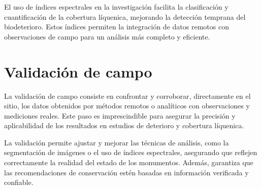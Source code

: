 El uso de índices espectrales en la investigación facilita la clasificación y cuantificación de la cobertura líquenica, mejorando la detección temprana del biodeterioro. Estos índices permiten la integración de datos remotos con observaciones de campo para un análisis más completo y eficiente.

\section{Validación de campo}
La validación de campo consiste en confrontar y corroborar, directamente en el sitio, los datos obtenidos por métodos remotos o analíticos con observaciones y mediciones reales. Este paso es imprescindible para asegurar la precisión y aplicabilidad de los resultados en estudios de deterioro y cobertura líquenica.

La validación permite ajustar y mejorar las técnicas de análisis, como la segmentación de imágenes o el uso de índices espectrales, asegurando que reflejen correctamente la realidad del estado de los monumentos. Además, garantiza que las recomendaciones de conservación estén basadas en información verificada y confiable.


